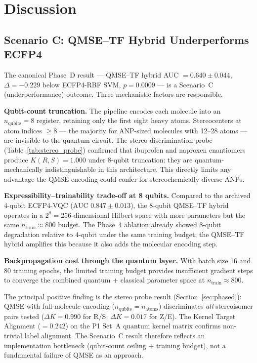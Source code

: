 \section{Discussion}

\subsection{Scenario C: QMSE--TF Hybrid Underperforms ECFP4}
\label{sec:disc_qmse}

The canonical Phase~D result --- QMSE--TF hybrid AUC $= 0.640 \pm 0.044$,
$\Delta = -0.229$ below ECFP4-RBF SVM, $p = 0.0009$ --- is a Scenario~C
(underperformance) outcome. Three mechanistic factors are responsible.

\textbf{Qubit-count truncation.} The pipeline encodes each molecule into an
$n_{\text{qubits}} = 8$ register, retaining only the first eight heavy atoms.
Stereocenters at atom indices $\geq 8$ --- the majority for ANP-sized molecules
with 12--28 atoms --- are invisible to the quantum circuit. The stereo-discrimination
probe (Table~\ref{tab:stereo_probe}) confirmed that ibuprofen and naproxen
enantiomers produce $K(R,S) = 1.000$ under 8-qubit truncation: they are
quantum-mechanically indistinguishable in this architecture. This directly limits
any advantage the QMSE encoding could confer for stereochemically diverse ANPs.

\textbf{Expressibility--trainability trade-off at 8 qubits.} Compared to the
archived 4-qubit ECFP4-VQC (AUC $0.847 \pm 0.013$), the 8-qubit QMSE--TF hybrid
operates in a $2^8 = 256$-dimensional Hilbert space with more parameters but the
same $n_{\text{train}} \approx 800$ budget. The Phase~4 ablation already showed
8-qubit degradation relative to 4-qubit under the same training budget; the QMSE--TF
hybrid amplifies this because it also adds the molecular encoding step.

\textbf{Backpropagation cost through the quantum layer.} With batch size 16 and
80 training epochs, the limited training budget provides insufficient gradient steps
to converge the combined quantum + classical parameter space at $n_{\text{train}} \approx 800$.

The principal positive finding is the stereo probe result (Section~\ref{sec:phased}):
QMSE with full-molecule encoding ($n_{\text{qubits}} = n_{\text{atoms}}$) discriminates
\emph{all} stereoisomer pairs tested ($\Delta K = 0.990$ for R/S; $\Delta K = 0.017$ for Z/E).
The Kernel Target Alignment ($= 0.242$) on the P1 Set~A quantum kernel matrix confirms
non-trivial label alignment. The Scenario~C result therefore reflects an implementation
bottleneck (qubit-count ceiling + training budget), not a fundamental failure of
QMSE as an approach.


